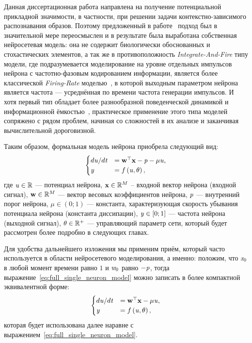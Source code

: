 Данная диссертационная работа направлена на получение потенциальной прикладной значимости, в частности, при решении задачи контекстно-зависимого распознавания образов. Поэтому предложенный в работе~\cite{EmelyanovYaroslavsky1990} подход был в значительной мере переосмыслен и в результате была выработана собственная нейросетевая модель: она не содержит биологически обоснованных и стохастических элементов, а так же в противоположность \textit{Integrate-And-Fire} типу модели, где подразумевается моделирование на уровне отдельных импульсов нейрона с частотно-фазовым кодированием информации, является более классической \textit{Firing-Rate}  моделью~\cite{Dayan2001}, в которой выходным параметром нейрона является \socalled частота --- усреднённая по времени частота генерации импульсов. И хотя первый тип обладает более разнообразной поведенческой динамикой и информационной ёмкостью~\cite{Izhikevich2006}, практическое применение этого типа моделей сопряжено с рядом проблем, начиная со сложностей в их анализе и заканчивая вычислительной дороговизной.

Таким образом, формальная модель нейрона приобрела следующий вид:
\begin{equation}
	\label{eq:full_single_neuron_model}
    \begin{cases}
	    d\mathit{u}/d\mathit{t} &= \mathrm{\mathbf{w}}^{\top} \mathrm{\mathbf{x}} - \mathit{p} - \mu \mathit{u}, \\
        \mathit{y}              &= f\left( \mathit{u}, \theta \right), \\
    \end{cases}
\end{equation}
где $\mathit{u} \in \mathbb{R}$ --- потенциал нейрона, $\mathrm{\mathbf{x}} \in \mathbb{R}^{M}$ -- входной вектор нейрона (входной сигнал), $\mathrm{\mathbf{w}} \in \mathbb{R}^{M}$ --- вектор весовых коэффициентов нейрона,  $\mathit{p}$ --- внутренний порог нейрона, $\mu \in \left(0;1\right)$ --- константа, характеризующая скорость убывания потенциала нейрона (константа диссипации), $\mathit{y} \in \left[0;1\right]$ --- частота нейрона (выходной сигнал), $\theta \in \mathbb{R}^{+}$ --- управляющий параметр сети, который будет рассмотрен более подробно в следующих главах. 

Для удобства дальнейшего изложения мы применим приём, который часто используется в области нейросетевого моделирования, а именно: положим, что $\vectoritem{x}{0}$ в любой момент времени равно $1$ и $\vectoritem{w}{0}$ равно $-\mathit{p}$, тогда выражение~\eqref{eq:full_single_neuron_model} можно записать в более компактной эквивалентной форме:
\begin{equation}
    \label{eq:single_neuron_model}
    \begin{cases}
    d\mathit{u}/d\mathit{t} &= \mathrm{\mathbf{w}}^{\top} \mathrm{\mathbf{x}} - \mu \mathit{u}, \\
    \mathit{y}              &= f\left( \mathit{u}, \theta \right), \\
    \end{cases}
\end{equation}
которая будет использована далее наравне с выражением~\eqref{eq:full_single_neuron_model}.

